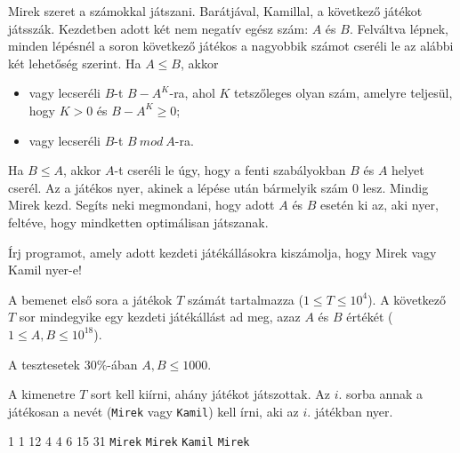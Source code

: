 





Mirek szeret a számokkal játszani. Barátjával, Kamillal, a következő játékot játsszák. Kezdetben adott két nem negatív egész szám: $A$ és $B$. Felváltva lépnek, minden lépésnél a soron következő játékos a nagyobbik számot cseréli le az alábbi két lehetőség szerint. Ha $A \leqslant B$, akkor

\begin{itemize}
	\item vagy lecseréli $B$-t $B - A^K$-ra, ahol $K$ tetszőleges olyan szám, amelyre teljesül, hogy $K > 0$ és $B - A^K \ge 0$;
	\item vagy lecseréli $B$-t $B\ mod\ A$-ra. 
\end{itemize}

Ha $B \leqslant A$, akkor $A$-t cseréli le úgy, hogy a fenti szabályokban $B$ és $A$ helyet cserél. Az a játékos nyer, akinek a lépése után bármelyik szám 0 lesz. Mindig Mirek kezd. Segíts neki megmondani, hogy adott $A$ és $B$ esetén ki az, aki nyer, feltéve, hogy mindketten optimálisan játszanak.

Írj programot, amely adott kezdeti játékállásokra kiszámolja, hogy Mirek vagy Kamil nyer-e!

A bemenet első sora a játékok $T$ számát tartalmazza ($1 \le T \le 10^4$).
A következő $T$ sor mindegyike egy kezdeti játékállást ad meg, azaz $A$ és $B$ értékét ($1 \le A, B \le 10^{18}$).

A tesztesetek $30\%$-ában $A,B \le 1000$.

A kimenetre $T$ sort kell kiírni, ahány játékot játszottak. Az $i$. sorba annak a játékosan a nevét (\texttt{Mirek} vagy \texttt{Kamil}) kell írni, aki az $i$. játékban nyer.


1 1
12 4
4 6
15 31
\sampleOUT
\texttt{Mirek}
\texttt{Mirek}
\texttt{Kamil}
\texttt{Mirek}
\sampleEND


